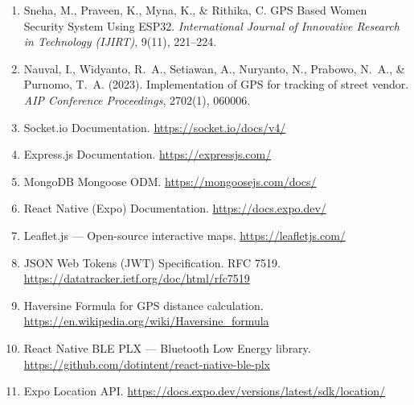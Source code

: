 \documentclass[12pt, a4paper]{article}
\begin{document}
\begin{enumerate}[noitemsep]
    \item Sneha, M., Praveen, K., Myna, K., \& Rithika, C. GPS Based Women Security System Using ESP32. \textit{International Journal of Innovative Research in Technology (IJIRT)}, 9(11), 221--224.
    \item Nauval, I., Widyanto, R.~A., Setiawan, A., Nuryanto, N., Prabowo, N.~A., \& Purnomo, T.~A. (2023). Implementation of GPS for tracking of street vendor. \textit{AIP Conference Proceedings}, 2702(1), 060006.
    \item Socket.io Documentation. \url{https://socket.io/docs/v4/}
    \item Express.js Documentation. \url{https://expressjs.com/}
    \item MongoDB Mongoose ODM. \url{https://mongoosejs.com/docs/}
    \item React Native (Expo) Documentation. \url{https://docs.expo.dev/}
    \item Leaflet.js --- Open-source interactive maps. \url{https://leafletjs.com/}
    \item JSON Web Tokens (JWT) Specification. RFC 7519. \url{https://datatracker.ietf.org/doc/html/rfc7519}
    \item Haversine Formula for GPS distance calculation. \url{https://en.wikipedia.org/wiki/Haversine_formula}
    \item React Native BLE PLX --- Bluetooth Low Energy library. \url{https://github.com/dotintent/react-native-ble-plx}
    \item Expo Location API. \url{https://docs.expo.dev/versions/latest/sdk/location/}
\end{enumerate}
\end{document}

